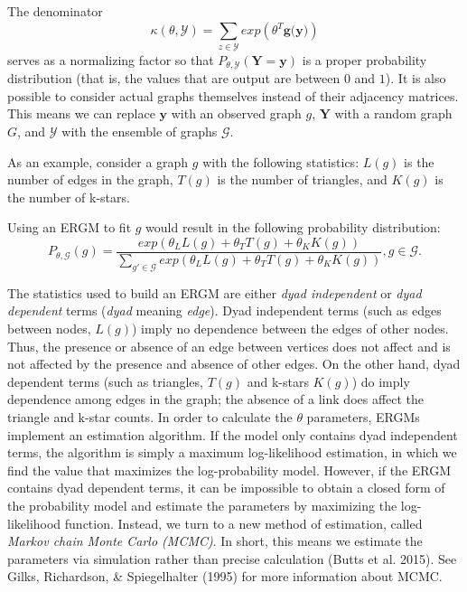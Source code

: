 \documentclass[12pt,twoside]{amherstthesis}
\begin{document}
  The denominator
  \[\kappa(\theta, \mathcal{Y}) = \sum_{z \in \mathcal{Y}}^{} exp(\theta^{T}\textbf{g(y)})\]
  serves as a normalizing factor so that
  \(P_{\theta, \mathcal{Y}}(\textbf{Y} = \textbf{y})\) is a proper
  probability distribution (that is, the values that are output are
  between \(0\) and \(1\)). It is also possible to consider actual graphs
  themselves instead of their adjacency matrices. This means we can
  replace \(\textbf{y}\) with an observed graph \(g\), \(\textbf{Y}\) with
  a random graph \(G\), and \(\mathcal{Y}\) with the ensemble of graphs
  \(\mathcal{G}\).
  
  As an example, consider a graph \(g\) with the following statistics:
  \(L(g)\) is the number of edges in the graph, \(T(g)\) is the number of
  triangles, and \(K(g)\) is the number of k-stars.
  
  Using an ERGM to fit \(g\) would result in the following probability
  distribution:
  \[P_{\theta, \mathcal{G}}(g) = \frac {exp(\theta_{L}L(g) + \theta_{T}T(g)+\theta_{K}K(g))} {\sum_{g' \in \mathcal{G}}^{} exp(\theta_{L}L(g) + \theta_{T}T(g)+\theta_{K}K(g))}, g \in \mathcal{G}.\]
  
  The statistics used to build an ERGM are either \emph{dyad independent}
  or \emph{dyad dependent} terms (\emph{dyad} meaning \emph{edge}). Dyad
  independent terms (such as edges between nodes, \(L(g)\)) imply no
  dependence between the edges of other nodes. Thus, the presence or
  absence of an edge between vertices does not affect and is not affected
  by the presence and absence of other edges. On the other hand, dyad
  dependent terms (such as triangles, \(T(g)\) and k-stars \(K(g)\)) do
  imply dependence among edges in the graph; the absence of a link does
  affect the triangle and k-star counts. In order to calculate the
  \(\theta\) parameters, ERGMs implement an estimation algorithm. If the
  model only contains dyad independent terms, the algorithm is simply a
  maximum log-likelihood estimation, in which we find the value that
  maximizes the log-probability model. However, if the ERGM contains dyad
  dependent terms, it can be impossible to obtain a closed form of the
  probability model and estimate the parameters by maximizing the
  log-likelihood function. Instead, we turn to a new method of estimation,
  called \emph{Markov chain Monte Carlo (MCMC)}. In short, this means we
  estimate the parameters via simulation rather than precise calculation
  (Butts et al. 2015). See Gilks, Richardson, \& Spiegelhalter (1995) for
  more information about MCMC.
  
\end{document}

